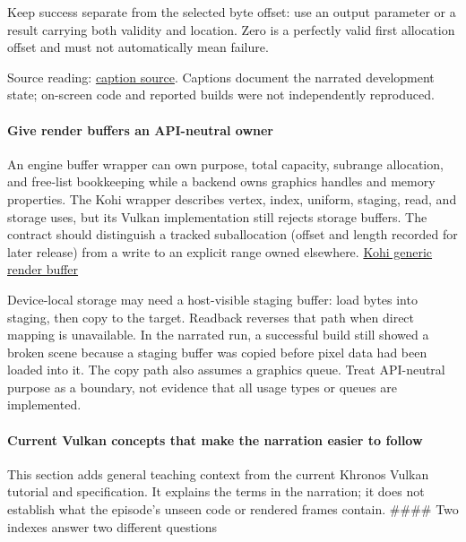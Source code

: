 Keep success separate from the selected byte offset: use an output parameter or a result carrying both validity and location. Zero is a perfectly valid first allocation offset and must not automatically mean failure.

Source reading: \href{https://www.youtube.com/watch?v=SNDJ-rGJd5A}{caption source}. Captions document the narrated development state; on-screen code and reported builds were not independently reproduced.

\paragraph{Give render buffers an API-neutral owner}\label{give-render-buffers-an-api-neutral-owner}

An engine buffer wrapper can own purpose, total capacity, subrange allocation, and free-list bookkeeping while a backend owns graphics handles and memory properties. The Kohi wrapper describes vertex, index, uniform, staging, read, and storage uses, but its Vulkan implementation still rejects storage buffers. The contract should distinguish a tracked suballocation (offset and length recorded for later release) from a write to an explicit range owned elsewhere. \href{https://www.youtube.com/watch?v=7mNgC7dGkZs}{Kohi generic render buffer}

Device-local storage may need a host-visible staging buffer: load bytes into staging, then copy to the target. Readback reverses that path when direct mapping is unavailable. In the narrated run, a successful build still showed a broken scene because a staging buffer was copied before pixel data had been loaded into it. The copy path also assumes a graphics queue. Treat API-neutral purpose as a boundary, not evidence that all usage types or queues are implemented.

\paragraph{Current Vulkan concepts that make the narration easier to follow}\label{current-vulkan-concepts-that-make-the-narration-easier-to-follow}

This section adds general teaching context from the current Khronos Vulkan tutorial and specification. It explains the terms in the narration; it does not establish what the episode's unseen code or rendered frames contain. \#\#\#\# Two indexes answer two different questions

